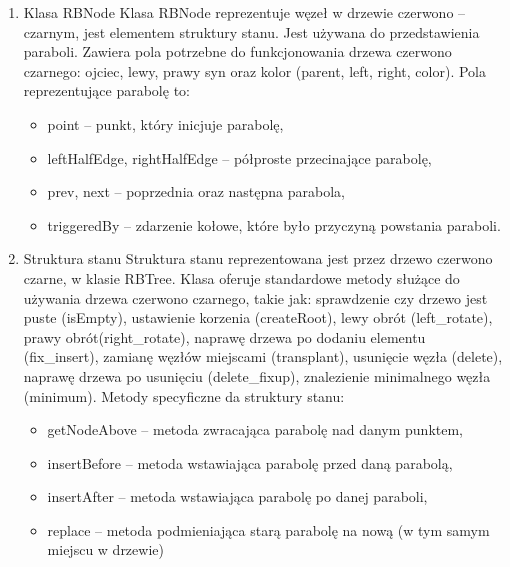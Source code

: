 \documentclass{article}
\begin{document}
\begin{enumerate}
    \item Klasa RBNode 
    \newline
    \newline
    Klasa RBNode reprezentuje węzeł w drzewie czerwono – czarnym, jest elementem struktury stanu. Jest używana do przedstawienia paraboli. Zawiera pola potrzebne do funkcjonowania drzewa czerwono czarnego: ojciec, lewy, prawy syn oraz kolor (parent, left, right, color). Pola reprezentujące parabolę to:
    \begin{itemize}
        \item point – punkt, który inicjuje parabolę,
        \item leftHalfEdge, rightHalfEdge – półproste przecinające parabolę,
        \item prev, next – poprzednia oraz następna parabola,
        \item triggeredBy – zdarzenie kołowe, które było przyczyną powstania paraboli.

    \end{itemize}
    
    
    \item Struktura stanu 
    \newline
    \newline
    Struktura stanu reprezentowana jest przez drzewo czerwono czarne, w klasie RBTree.
    Klasa oferuje standardowe metody służące do używania drzewa czerwono czarnego, takie jak: sprawdzenie czy drzewo jest puste (isEmpty), ustawienie korzenia (createRoot), lewy obrót (left\_rotate), prawy obrót(right\_rotate), naprawę drzewa po dodaniu elementu (fix\_insert), zamianę węzłów miejscami (transplant), usunięcie węzła (delete), naprawę drzewa po usunięciu (delete\_fixup), znalezienie minimalnego węzła (minimum).
    \newline
    \newline
    Metody specyficzne da struktury stanu:
    \begin{itemize}
        \item getNodeAbove – metoda zwracająca parabolę nad danym punktem,
        \item insertBefore – metoda wstawiająca parabolę przed daną parabolą,
        \item insertAfter – metoda wstawiająca parabolę po danej paraboli,
        \item replace – metoda podmieniająca starą parabolę na nową (w tym samym miejscu w drzewie)

    \end{itemize}


\end{enumerate}
\end{document}
